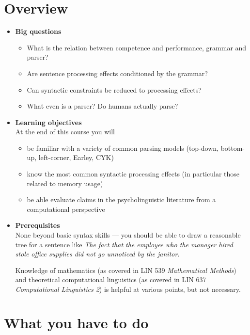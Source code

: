 \section{Overview}
\begin{itemize}
    \item \textbf{Big questions}
        \begin{itemize}
            \item What is the relation between competence and performance, grammar and parser?
            \item Are sentence processing effects conditioned by the grammar?
            \item Can syntactic constraints be reduced to processing effects?
            \item What even is a parser? Do humans actually parse?
        \end{itemize}

    \item \textbf{Learning objectives}\\
        At the end of this course you will 
        \begin{itemize}
            \item be familiar with a variety of common parsing models (top-down, bottom-up, left-corner, Earley, CYK)
            \item know the most common syntactic processing effects (in particular those related to memory usage)
            \item be able evaluate claims in the psycholinguistic literature from a computational perspective
        \end{itemize}

    \item \textbf{Prerequisites}\\
    None beyond basic syntax skills --- you should be able to draw a reasonable tree for a sentence like \emph{The fact that the employee who the manager hired stole office supplies did not go unnoticed by the janitor}.

    Knowledge of mathematics (as covered in LIN 539 \emph{Mathematical Methods}) and theoretical computational linguistics (as covered in LIN 637 \emph{Computational Linguistics 2}) is helpful at various points, but not necessary.
\end{itemize}

\section{What you have to do}

